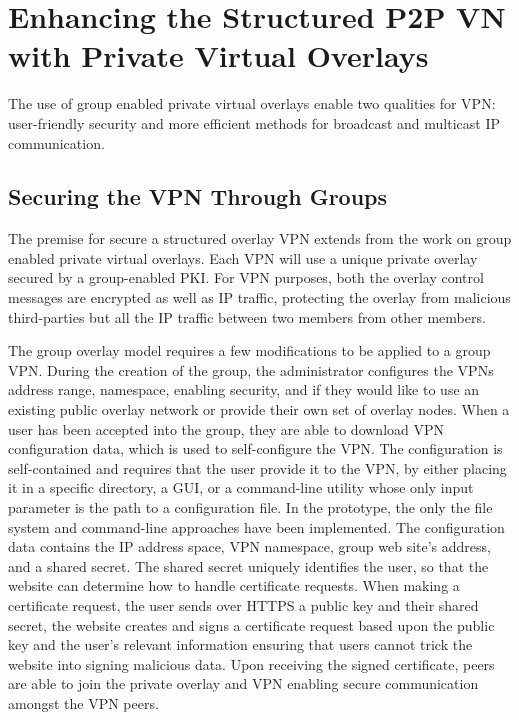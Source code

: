 \section{Enhancing the Structured P2P VN with Private Virtual Overlays}
The use of group enabled private virtual overlays enable two qualities for
VPN:  user-friendly security and more efficient methods for broadcast and
multicast IP communication.

\subsection{Securing the VPN Through Groups}
\label{groupvpn}
The premise for secure a structured overlay VPN extends from the work on
group enabled private virtual overlays.  Each VPN will use a unique private
overlay secured by a group-enabled PKI.  For VPN purposes, both the overlay
control messages are encrypted as well as IP traffic, protecting the overlay
from malicious third-parties but all the IP traffic between two members from
other members.

The group overlay model requires a few modifications to be applied to a group
VPN.  During the creation of the group, the administrator configures the VPNs
address range, namespace, enabling security, and if they would like to use an
existing public overlay network or provide their own set of overlay nodes.
When a user has been accepted into the group, they are able to download VPN
configuration data, which is used to self-configure the VPN.  The configuration
is self-contained and requires that the user provide it to the VPN, by either
placing it in a specific directory, a GUI, or a command-line utility whose only
input parameter is the path to a configuration file.  In the prototype, the
only the file system and command-line approaches have been implemented.  The
configuration data contains the IP address space, VPN namespace, group web site's
address, and a shared secret.  The shared secret uniquely identifies the user,
so that the website can determine how to handle certificate requests.  When
making a certificate request, the user sends over HTTPS a public key and their
shared secret, the website creates and signs a certificate request based upon
the public key and the user's relevant information ensuring that users cannot
trick the website into signing malicious data.  Upon receiving the signed
certificate, peers are able to join the private overlay and VPN enabling
secure communication amongst the VPN peers.

